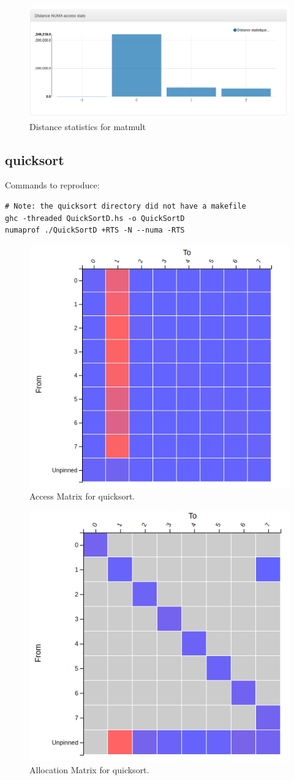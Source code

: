 \documentclass[a4paper,11pt]{article}
\begin{document}
\begin{figure}[!htb]
    \centering
    \includegraphics[width=\linewidth]{TechMemo/results/matmult/matmult_distance.png}
    \caption{Distance statistics for matmult}
    \label{fig:matmult_distance}
\end{figure}

\subsection{quicksort}

Commands to reproduce:
\begin{lstlisting}
# Note: the quicksort directory did not have a makefile
ghc -threaded QuickSortD.hs -o QuickSortD
numaprof ./QuickSortD +RTS -N --numa -RTS
\end{lstlisting}

\begin{figure}[!htb]
    \centering
    \includegraphics[width=0.5\linewidth]{TechMemo/results/quicksort/access_matrix.png}
    \caption{Access Matrix for quicksort.}
    \label{fig:quicksort_access_matrix}
\end{figure}

\begin{figure}[!htb]
    \centering
    \includegraphics[width=0.5\linewidth]{TechMemo/results/quicksort/alloc_quicksort_.png}
    \caption{Allocation Matrix for quicksort.}
    \label{fig:quicksort_alloc_matrix}
\end{figure}
\end{document}
